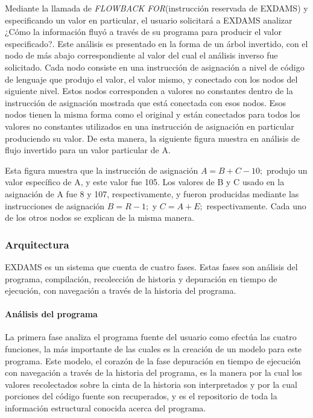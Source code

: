\documentclass[12pt,legalpaper]{report}
\begin{document}
Mediante la llamada de \textit{FLOWBACK FOR}(instrucción reservada de EXDAMS) y especificando un valor en particular, el usuario solicitará a EXDAMS analizar ¿Cómo la información fluyó a través de su programa para producir el valor especificado?.  Este análisis es presentado en la forma de un árbol invertido, con el nodo de más abajo correspondiente al valor del cual el análisis inverso fue solicitado.  Cada nodo consiste en una instrucción de asignación a nivel de código de lenguaje que produjo el valor, el valor mismo, y conectado con los nodos del siguiente nivel.  Estos nodos corresponden a valores no constantes dentro de la instrucción de asignación mostrada que está conectada con esos nodos.  Esos nodos tienen la misma forma como el original y están conectados para todos los valores no constantes utilizados en una instrucción de asignación en particular produciendo su valor.  De esta manera, la siguiente figura muestra en análisis de flujo invertido para un valor particular de A. 

Esta figura muestra que la instrucción de asignación $A=B+C-10;$ produjo un valor específico de A, y este valor fue 105.  Los valores de B y C usado en la asignación de A fue 8 y 107, respectivamente, y fueron producidas mediante las instrucciones de asignación $B=R-1;$ y $C=A+E;$ respectivamente.  Cada uno de los otros nodos se explican de la misma manera.

			\subsubsection{Arquitectura}

EXDAMS es un sistema que cuenta de cuatro fases.  Estas fases son análisis del programa, compilación, recolección de historia y depuración en tiempo de ejecución, con navegación a través de la historia del programa.

				\paragraph{Análisis del programa}

La primera fase analiza el programa fuente del usuario como efectúa las cuatro funciones, la más importante de las cuales es la creación de un modelo para este programa.  Este modelo, el corazón de la fase depuración en tiempo de ejecución con navegación a través de la historia del programa, es la manera por la cual los valores recolectados sobre la cinta de la historia son interpretados y por la cual porciones del código fuente son recuperados, y es el repositorio de toda la información estructural conocida acerca del programa.
\end{document}
